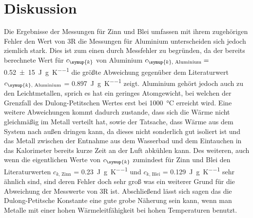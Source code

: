 \section{Diskussion}
\label{sec:Diskussion}
Die Ergebnisse der Messungen für Zinn und Blei umfassen mit
ihrem zugehörigen Fehler den Wert von 3R die Messungen für Aluminium unterscheiden
sich jedoch ziemlich stark. Dies ist zum einen durch Messfehler zu begründen,
da der bereits berechnete Wert für $c_\symup{k}$ von Aluminium $c_{\symup{k}\text{, Aluminium}} =$
 \SI{0,52(15)}{\joule\per\gram\per\kelvin} die größte Abweichung
gegenüber dem Literaturwert $c_{\symup{k}\text{, Aluminium}}$ = \SI{0,897}
{\joule\per\gram\per\kelvin} zeigt. Aluminium gehört jedoch auch zu den Leichtmetallen,
sprich es hat ein geringes Atomgewicht, bei welchen der Grenzfall des Dulong-Petitschen
Wertes erst bei \SI{1000}{\celsius} erreicht wird.
Eine weitere Abweichungen kommt dadurch zustande, dass sich die Wärme nicht gleichmäßig im Metall verteilt hat,
sowie der Tatsache, dass Wärme aus dem System nach außen dringen
kann, da dieses nicht sonderlich gut isoliert ist und das Metall zwischen
der Entnahme aus dem Wasserbad und dem Eintauchen in das Kalorimeter
bereits kurze Zeit an der Luft abkühlen kann. Des weiteren,
auch wenn die eigentlichen Werte von $c_\symup{k}$ zumindest für
Zinn und Blei den Literaturwerten\cite{chemie}  $c_{k\text{, Zinn}}$ = \SI{0,23}{\joule\per\gram\per\kelvin}
und $c_{k\text{, Blei}}$ = \SI{0,129}{\joule\per\gram\per\kelvin}
sehr ähnlich sind, sind deren Fehler doch
sehr groß was ein weiterer Grund für die Abweichung der Messwerte
von 3R ist. Abschließend lässt sich sagen das die Dulong-Petitsche
Konstante eine gute grobe Näherung sein kann, wenn man Metalle mit einer
hohen Wärmeleitfähigkeit bei hohen Temperaturen benutzt.
